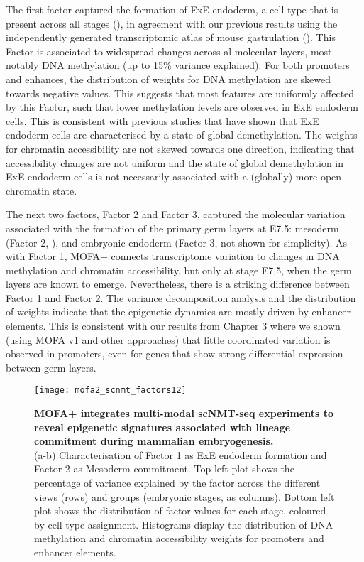 The first factor captured the formation of ExE endoderm, a cell type that is present across all stages (), in agreement with our previous results using the independently generated transcriptomic atlas of mouse gastrulation (). This Factor is associated to widespread changes across al molecular layers, most notably DNA methylation (up to 15\% variance explained). For both promoters and enhances, the distribution of weights for DNA methylation are skewed towards negative values. This suggests that most features are uniformly affected by this Factor, such that lower methylation levels are observed in ExE endoderm cells. This is consistent with previous studies that have shown that ExE endoderm cells are characterised by a state of global demethylation\cite{Zhang2017,Argelaguet2019}. The weights for chromatin accessibility are not skewed towards one direction, indicating that accessibility changes are not uniform and the state of global demethylation in ExE endoderm cells is not necessarily associated with a (globally) more open chromatin state.

The next two factors, Factor 2 and Factor 3, captured the molecular variation associated with the formation of the primary germ layers at E7.5: mesoderm (Factor 2, ), and embryonic endoderm (Factor 3, not shown for simplicity). As with Factor 1, MOFA+ connects transcriptome variation to changes in DNA methylation and chromatin accessibility, but only at stage E7.5, when the germ layers are known to emerge. Nevertheless, there is a striking difference between Factor 1 and Factor 2. The variance decomposition analysis and the distribution of weights indicate that the epigenetic dynamics are mostly driven by enhancer elements. This is consistent with our results from Chapter 3 where we shown (using MOFA v1 and other approaches) that little coordinated variation is observed in promoters, even for genes that show strong differential expression between germ layers.

\begin{figure}[H]
	\centering
	\texttt{[image: mofa2\_scnmt\_factors12]}
	\caption[]{
	\textbf{MOFA+ integrates multi-modal scNMT-seq experiments to reveal epigenetic signatures associated with lineage commitment during mammalian embryogenesis.} \\
	(a-b) Characterisation of Factor 1 as ExE endoderm formation and Factor 2 as Mesoderm commitment. Top left plot shows the percentage of variance explained by the factor across the different views (rows) and groups (embryonic stages, as columns). Bottom left plot shows the distribution of factor values for each stage, coloured by cell type assignment. Histograms display the distribution of DNA methylation and chromatin accessibility weights for promoters and enhancer elements.
	}
	\label{fig:mofa2_scnmt_factors12}
\end{figure}

